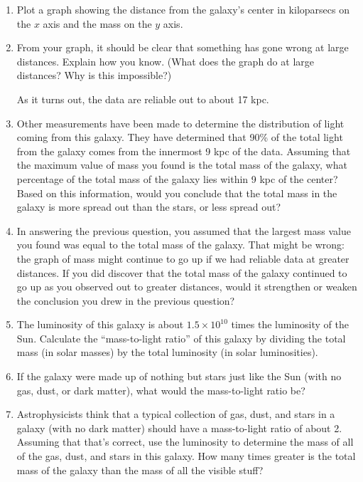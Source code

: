 \begin{enumerate}
\item Plot a graph showing the distance from the galaxy's center
in kiloparsecs on the $x$ axis and the mass on the $y$ axis.

\item From your graph, it should be clear that something has gone 
wrong at large distances.  Explain how you know.  (What does the graph
do at large distances?  Why is this impossible?)

\vskip 1.5in

As it turns out, the data are reliable out to about 17 kpc.

\item Other measurements have been made to determine the 
distribution of light coming from this galaxy.  They have determined
that 90\% of the total light from the galaxy comes from the
innermost 9 kpc of the data.  Assuming that the maximum value
of mass you found is the total mass of the galaxy, what percentage of the
total mass of the galaxy lies within 9 kpc of the center? 
Based on this information, would you conclude that the total mass
in the galaxy is more spread out than the stars, or less spread out?

\newpage

\vskip 1.5in

\item In answering the previous question, you assumed that the
largest mass value you found was equal to the total mass of the galaxy.
That might be wrong: the graph of mass might continue to go up if
we had reliable data at greater distances.  If you did discover
that the total mass of the galaxy continued to go up as you observed
out to greater distances, would it strengthen or weaken
the conclusion you drew in the previous question?

\vskip 1in

\item The luminosity of this galaxy is about $1.5\times 10^{10}$
times the luminosity of the Sun.  Calculate the ``mass-to-light
ratio'' of this galaxy by dividing the total mass (in solar masses)
by the total luminosity (in solar luminosities).  

\vskip 0.5in

\item If the galaxy were made
up of nothing but stars just like the Sun (with no gas, dust,
or dark matter), what would the mass-to-light ratio be?

\vskip 0.5in

\item Astrophysicists think that a typical collection of gas,
dust, and stars in a galaxy (with no dark matter) 
should have a mass-to-light ratio of about 2.  Assuming that
that's correct, use the luminosity to 
determine the mass of all of the gas, dust, and
stars in this galaxy.  How many times greater is the total mass
of the galaxy than the mass of all the visible stuff?

\end{enumerate}


